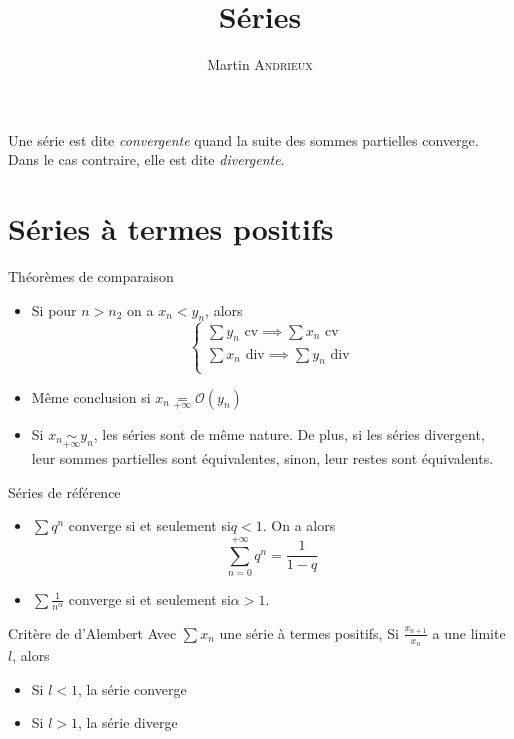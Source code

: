 \documentclass[french, a4paper, 11pt, twocolumn]{article}
\title{Séries}
\author{Martin \textsc{Andrieux}}
\date{}
\newcommand{\ssi}{si et seulement si\xspace}		%
\newcommand{\inv}[1]{\dfrac{1}{#1}}
\begin{document}
\maketitle

\begin{definition}
  Une série est dite \emph{convergente} quand la suite des sommes partielles converge. Dans le cas contraire, elle est dite \emph{divergente}.
\end{definition}

\section{Séries à termes positifs}
\begin{theoreme}{Théorèmes de comparaison}
  \begin{itemize}[label=\(\bullet\)]
    \item Si pour \(n>n_{2}\) on a \(x_{n}<y_{n}\), alors
      \[\begin{cases}
          \sum y_{n} \text{ cv} \implies \sum x_{n} \text{ cv}\\
          \sum x_{n} \text{ div} \implies \sum y_{n} \text{ div}\\
      \end{cases}\]
    \item Même conclusion si \(x_{n} \underset{+\infty}{=} \mathcal{O}(y_{n})\)
    \item Si \(x_{n} \underset{+\infty}{\sim} y_{n}\), les séries sont de même nature. De plus, si les séries divergent, leur sommes partielles sont équivalentes, sinon, leur restes sont équivalents.
  \end{itemize}
\end{theoreme}

\begin{theoreme}{Séries de référence}
  \begin{itemize}[label=\(\bullet\)]
    \item \(\sum q^{n}\) converge \ssi \(q<1\). On a alors
      \[\sum_{n=0}^{+\infty}q^{n} = \inv{1-q}\]
    \item \(\sum \frac{1}{n^{\alpha}}\) converge \ssi\(\alpha > 1\).
  \end{itemize}
\end{theoreme}

\begin{theoreme}{Critère de d'Alembert}
  Avec \(\sum x_{n}\) une série à termes positifs,
  Si \(\frac{x_{n+1}}{x_{n}}\) a une limite \(l\), alors
  \begin{itemize}[label=\(\bullet\)]
    \item Si \(l<1\), la série converge
    \item Si \(l>1\), la série diverge
  \end{itemize}
\end{theoreme}
\end{document}

